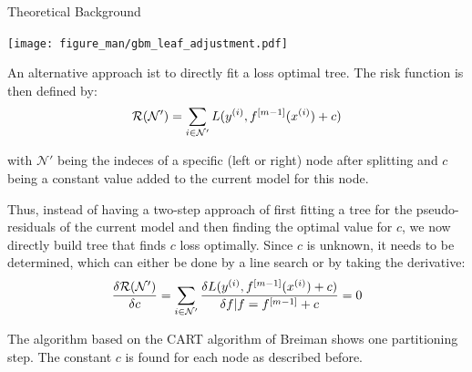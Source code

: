\begin{vbframe}{Theoretical Background}
\begin{footnotesize}
\vspace{-0.5cm}

\begin{center}

\texttt{[image: figure\_man/gbm\_leaf\_adjustment.pdf]}

\end{center}

\end{footnotesize}

\framebreak

An alternative approach ist to directly fit a loss optimal tree.
The risk function is then defined by:
$$
\mathcal{R}(\mathcal{N}') = \sum_{i \in \mathcal{N}'} L(y^{(i)}, f^{[m-1]}(x^{(i)}) + c)
$$

with $\mathcal{N}'$ being the indeces of a specific (left or right) node after splitting and $c$ being a constant value added to the current model for this node.

Thus, instead of having a two-step approach of first fitting a tree for the pseudo-residuals of the current model and then finding the optimal value for $c$, we now directly build tree that finds $c$ loss optimally. Since $c$ is unknown, it needs to be determined, which can either be done by a line search or by taking the derivative:
$$
\frac{\delta{\mathcal{R}(\mathcal{N}')}}{\delta c} = \sum_{i \in \mathcal{N}'} \frac{\delta{L(y^{(i)}, f^{[m-1]}(x^{(i)}) + c)}}{\delta f | f = f^{[m-1]} + c} = 0
$$
\framebreak


The algorithm based on the CART algorithm of Breiman shows one partitioning step. The constant $c$ is found for each node as described before. 
\end{vbframe}



